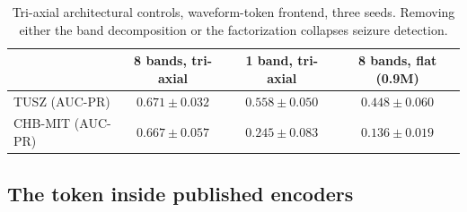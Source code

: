 \begin{table}[t]
\centering
\small
\caption{Axis-free design variants, single seeds. ``fold'' = band rows
folded into spatial attention; ``strength'' = explicit $|Z|$ feature.}
\label{tab:design}
\end{table}

\begin{table}[t]
\centering
\small
\caption{Tri-axial architectural controls, waveform-token frontend, three
seeds. Removing either the band decomposition or the factorization
collapses seizure detection.}
\label{tab:arch}
\begin{tabular}{lccc}
\toprule
 & 8 bands, tri-axial & 1 band, tri-axial & 8 bands, flat (0.9M) \\
\midrule
TUSZ (AUC-PR) & $0.671 \pm 0.032$ & $0.558 \pm 0.050$ & $0.448 \pm 0.060$ \\
CHB-MIT (AUC-PR) & $0.667 \pm 0.057$ & $0.245 \pm 0.083$ & $0.136 \pm 0.019$ \\
\bottomrule
\end{tabular}
\end{table}

\subsection{The token inside published encoders}
\label{sec:transplant}

